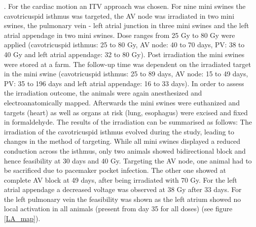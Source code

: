 \documentclass[type=dr, dr=rernat, accentcolor=tud7b,colorbacktitle, bigchapter, openright, twoside, 12pt ]{tudthesis}
\begin{document}
\cite{Ozh08}. For the cardiac motion an ITV approach was chosen. 
For nine mini swines the cavotricuspid isthmus was targeted, the AV node was irradiated in two mini swines, the pulmonary vein - left atrial 
junction in three mini swines and the left atrial appendage in two mini swines. Dose ranges from 25 Gy to 80 Gy were applied 
(cavotricuspid isthmus: 25 to 80 Gy, AV node: 40 to 70 days, PV: 38 to 40 Gy and left atrial appendage: 32 to 80 Gy). Post irradiation 
the mini swines were stored at a farm. The follow-up time was dependent on the irradiated target in the mini swine (cavotricuspid isthmus: 25 
to 89 days, AV node: 15 to 49 days, PV: 35 to 196 days and left atrial appendage: 16 to 33 days). 
In order to assess the irradiation outcome, the animals were again anesthesized and electroanatomically mapped. Afterwards the mini swines 
were euthanized and targets (heart) as well as organs at risk (lung, esophagus) were excised and fixed in formaldehyde. The results of the 
irradiation can be summarised as follows:
The irradiation of the cavotricuspid isthmus evolved during the study, leading to changes in the method of targeting. While all mini swines 
displayed a reduced conduction across the isthmus, only two animals showed bidirectional block and hence feasibility at 30 days and 40 Gy.   
Targeting the AV node, one animal had to be sacrificed due to pacemaker pocket infection. The other one showed at complete AV block at 49 days, 
after being irradiated with 70 Gy. For the left atrial appendage a decreased voltage was observed at 38 Gy after 33 days. For the left 
pulmonary vein the feasibility was shown as the left atrium showed no local activation in all animals (present from day 35 for all doses) 
(see figure \ref{LA_map}).
% 
\end{document}
